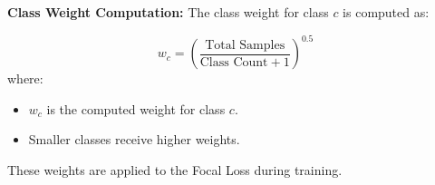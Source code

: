 \textbf{Class Weight Computation:}
The class weight for class $c$ is computed as:

\[
w_c = \left( \frac{\text{Total Samples}}{\text{Class Count} + 1} \right)^{0.5}
\]
where:
\begin{itemize}
    \item $w_c$ is the computed weight for class $c$.
    \item Smaller classes receive higher weights.
\end{itemize}

These weights are applied to the Focal Loss during training.






 
